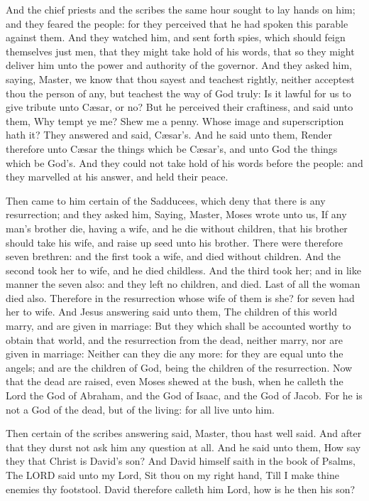  And the chief priests and the scribes the same hour sought
to lay hands on him; and they feared the people: for they perceived that
he had spoken this parable against them.  And they watched
him, and sent forth spies, which should feign themselves just men, that
they might take hold of his words, that so they might deliver him unto
the power and authority of the governor.  And they asked
him, saying, Master, we know that thou sayest and teachest rightly,
neither acceptest thou the person of any, but teachest the way of God
truly:  Is it lawful for us to give tribute unto Cæsar, or
no?  But he perceived their craftiness, and said unto them,
Why tempt ye me?  Shew me a penny. Whose image and
superscription hath it? They answered and said, Cæsar's. 
And he said unto them, Render therefore unto Cæsar the things which be
Cæsar's, and unto God the things which be God's.  And they
could not take hold of his words before the people: and they marvelled
at his answer, and held their peace.

 Then came to him certain of the Sadducees, which deny that
there is any resurrection; and they asked him,  Saying,
Master, Moses wrote unto us, If any man's brother die, having a wife,
and he die without children, that his brother should take his wife, and
raise up seed unto his brother.  There were therefore seven
brethren: and the first took a wife, and died without children.
 And the second took her to wife, and he died childless.
 And the third took her; and in like manner the seven also:
and they left no children, and died.  Last of all the woman
died also.  Therefore in the resurrection whose wife of
them is she? for seven had her to wife.  And Jesus
answering said unto them, The children of this world marry, and are
given in marriage:  But they which shall be accounted
worthy to obtain that world, and the resurrection from the dead, neither
marry, nor are given in marriage:  Neither can they die any
more: for they are equal unto the angels; and are the children of God,
being the children of the resurrection.  Now that the dead
are raised, even Moses shewed at the bush, when he calleth the Lord the
God of Abraham, and the God of Isaac, and the God of Jacob.
 For he is not a God of the dead, but of the living: for
all live unto him.

 Then certain of the scribes answering said, Master, thou
hast well said.  And after that they durst not ask him any
question at all.  And he said unto them, How say they that
Christ is David's son?  And David himself saith in the book
of Psalms, The LORD said unto my Lord, Sit thou on my right hand,
 Till I make thine enemies thy footstool. 
David therefore calleth him Lord, how is he then his son?

